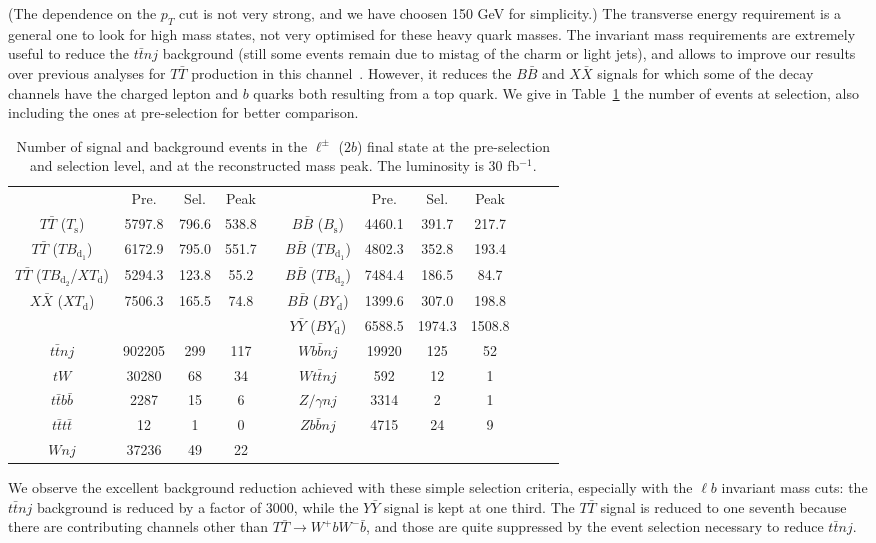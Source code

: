 \documentclass[12pt,a4paper]{article}
\newcommand{\TT}{T \bar T}
\newcommand{\BB}{B \bar B}
\newcommand{\XX}{X \bar X}
\newcommand{\YY}{Y \bar Y}
\newcommand{\Ts}{T_\text{s}}
\newcommand{\Bs}{B_\text{s}}
\newcommand{\TBd}{TB_{\text{d}_1}}
\newcommand{\TBD}{TB_{\text{d}_2}}
\newcommand{\XTd}{XT_\text{d}}
\newcommand{\BYd}{BY_\text{d}}
\begin{document}
(The dependence on the $p_T$ cut is not very strong, and we have choosen 150 GeV for simplicity.)
The transverse energy requirement is a general one to look for high mass states, not very optimised for these heavy quark masses.
The invariant mass requirements are extremely useful to reduce the $t \bar t nj$ background (still some events remain due to mistag of the charm or light jets), and allows to improve our results over previous analyses for $\TT$ production in this channel~\cite{AguilarSaavedra:2005pv,AguilarSaavedra:2006gv}.
However, it reduces the $\BB$ and $\XX$ signals for which some of the decay channels have the charged lepton and $b$ quarks both resulting from a top quark.
 We give in Table~\ref{tab:nsnb-1Q1-2b} the number of events at selection, also including the ones at pre-selection for better comparison.
%
\begin{table}[htb]
\begin{center}
\begin{tabular}{cccccccccccc}
                  & Pre.   & Sel.  & Peak  & \quad &    
                  & Pre.   & Sel.  & Peak
               \\[1mm]
   $\TT$ ($\Ts$)  & 5797.8 & 796.6 & 538.8 && $\BB$ ($\Bs$)  & 4460.1 & 391.7  & 217.7 \\
   $\TT$ ($\TBd$) & 6172.9 & 795.0 & 551.7 && $\BB$ ($\TBd$) & 4802.3 & 352.8  & 193.4 \\
   $\TT$ ($\TBD$/$\XTd$) & 5294.3 & 123.8 & 55.2  && $\BB$ ($\TBD$) & 7484.4 & 186.5  & 84.7 \\
   $\XX$ ($\XTd$) & 7506.3 & 165.5 & 74.8  && $\BB$ ($\BYd$) & 1399.6 & 307.0  & 198.8 \\ 
                  &        &       &       && $\YY$ ($\BYd$) & 6588.5 & 1974.3 & 1508.8\\
\hline
   $t \bar tnj$   & 902205 & 299   & 117   && $W b \bar bnj$ & 19920  & 125    & 52\\
   $tW$           & 30280  & 68    & 34    && $W t \bar tnj$ & 592    & 12     & 1 \\
   $t\bar tb\bar b$ & 2287 & 15    & 6     && $Z/\gamma nj$  & 3314   & 2      & 1 \\
   $t\bar tt\bar t$ & 12   & 1     & 0     && $Z b \bar bnj$ & 4715   & 24     & 9 \\
   $Wnj$          & 37236  & 49    & 22
\end{tabular}
\end{center}
\caption{Number of signal and background events in the $\ell^\pm$ ($2b$) final state at the pre-selection and selection level, and at the reconstructed mass peak. The luminosity is 30 fb$^{-1}$.}
\label{tab:nsnb-1Q1-2b}
\end{table}
%
We observe the excellent background reduction achieved with these simple selection criteria, especially with the $\ell b$ invariant mass cuts: the $t \bar t nj$ background is reduced by a factor of 3000, while the $\YY$ signal is kept at one third. The $\TT$ signal is reduced to one seventh because there are contributing channels other than $\TT \to W^+ b W^- \bar b$, and those are quite suppressed by the event selection necessary to reduce $t \bar t nj$. 
\end{document}
